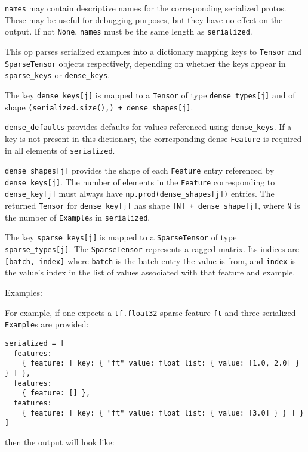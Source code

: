 \texttt{names} may contain descriptive names for the corresponding
serialized protos. These may be useful for debugging purposes, but they
have no effect on the output. If not \texttt{None}, \texttt{names} must
be the same length as \texttt{serialized}.

This op parses serialized examples into a dictionary mapping keys to
\texttt{Tensor} and \texttt{SparseTensor} objects respectively,
depending on whether the keys appear in \texttt{sparse\_keys} or
\texttt{dense\_keys}.

The key \texttt{dense\_keys{[}j{]}} is mapped to a \texttt{Tensor} of
type \texttt{dense\_types{[}j{]}} and of shape
\texttt{(serialized.size(),)\ +\ dense\_shapes{[}j{]}}.

\texttt{dense\_defaults} provides defaults for values referenced using
\texttt{dense\_keys}. If a key is not present in this dictionary, the
corresponding dense \texttt{Feature} is required in all elements of
\texttt{serialized}.

\texttt{dense\_shapes{[}j{]}} provides the shape of each
\texttt{Feature} entry referenced by \texttt{dense\_keys{[}j{]}}. The
number of elements in the \texttt{Feature} corresponding to
\texttt{dense\_key{[}j{]}} must always have
\texttt{np.prod(dense\_shapes{[}j{]})} entries. The returned
\texttt{Tensor} for \texttt{dense\_key{[}j{]}} has shape
\texttt{{[}N{]}\ +\ dense\_shape{[}j{]}}, where \texttt{N} is the number
of \texttt{Example}s in \texttt{serialized}.

The key \texttt{sparse\_keys{[}j{]}} is mapped to a
\texttt{SparseTensor} of type \texttt{sparse\_types{[}j{]}}. The
\texttt{SparseTensor} represents a ragged matrix. Its indices are
\texttt{{[}batch,\ index{]}} where \texttt{batch} is the batch entry the
value is from, and \texttt{index} is the value's index in the list of
values associated with that feature and example.

Examples:

For example, if one expects a \texttt{tf.float32} sparse feature
\texttt{ft} and three serialized \texttt{Example}s are provided:

\begin{verbatim}
serialized = [
  features:
    { feature: [ key: { "ft" value: float_list: { value: [1.0, 2.0] } } ] },
  features:
    { feature: [] },
  features:
    { feature: [ key: { "ft" value: float_list: { value: [3.0] } } ] }
]
\end{verbatim}

then the output will look like:

